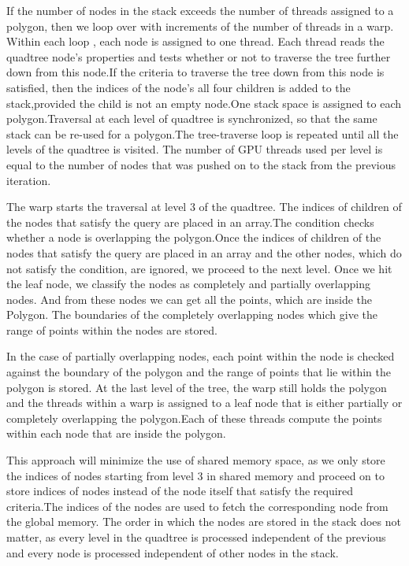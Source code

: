 \documentclass{article}
\begin{document}
If the number of nodes in the stack exceeds the number of threads assigned to a polygon, then we loop over with increments of the number of threads in a warp. Within each loop , each node is assigned to one thread.
Each thread reads the quadtree node's properties and tests whether or not to traverse the tree further down from this node.If the criteria to traverse the tree down from this node is satisfied, then the indices of the node's all four children is added to the stack,provided the child is not an empty node.One stack space is assigned to each polygon.Traversal at each level of quadtree is synchronized, so that the same stack can be re-used for a polygon.The tree-traverse loop is repeated until all the levels of the quadtree is visited.
The number of GPU threads used per level is equal to the number of nodes that was pushed on to the stack from the previous iteration.

The warp starts the traversal at level 3 of the quadtree. The indices of children of the nodes that satisfy the query are placed in an array.The condition checks whether a node is overlapping the polygon.Once the indices of children of the nodes that satisfy the query are placed in an array and the other nodes, which do not satisfy the condition, are ignored, we proceed to the next level.
Once we hit the leaf node, we classify the nodes as completely and partially overlapping nodes. And from these nodes we can get all the points, which are inside the Polygon.
The boundaries of the completely overlapping nodes  which give the range of points within the nodes are stored.

 In the case of partially overlapping nodes, each point within the node is checked against the boundary of the polygon and the range of points that lie within the polygon is stored. At the last level of the tree, the warp still holds the polygon and the threads within a warp is assigned to a leaf node that is either partially or completely overlapping the polygon.Each of these threads compute the points within each node that are inside the polygon.

This approach will minimize the use of shared memory space, as we only store the indices of nodes starting from level 3 in shared memory and proceed on to store indices of nodes instead of the node itself that satisfy the required criteria.The indices of the nodes are used to fetch the corresponding node from the global memory.
The order in which the nodes are stored in the stack does not matter, as every level in the quadtree is processed independent of the previous and every node is processed independent of other nodes in the stack.
\end{document}
